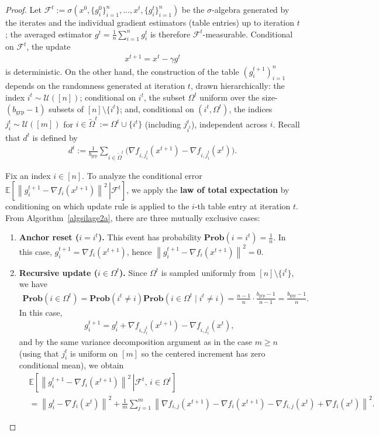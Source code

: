 \documentclass{article}
\newcommand{\sqn}[1]{\left\| #1 \right\|^2}
\newcommand{\eqdef}{:=}
\newcommand{\Prob}{\mathbf{Prob}}
\newcommand{\Expb}[2]{\mathbb{E}\!\left[\left. #1\,\right|#2 \right]}
\newcommand{\Expc}[1]{\Expb{#1}{\mathcal{F}^t}}
\newcommand{\rb}[1]{\left(#1\right)}
\theoremstyle{plain}
\begin{document}
\begin{proof}


Let $\mathcal{F}^t \eqdef \sigma\rb{x^0, \{g_i^0\}_{i=1}^n, \dots, x^t, \{g_i^t\}_{i=1}^n}$ be the $\sigma$-algebra generated by the iterates and the individual gradient estimators (table entries) up to iteration $t$; the averaged estimator $g^t = \frac{1}{n}\sum_{i=1}^n g_i^t$ is therefore $\mathcal{F}^t$-measurable. Conditional on $\mathcal{F}^t$, the update
\begin{align*}
x^{t+1}=x^t-\gamma g^t
\end{align*}
is deterministic. On the other hand, the construction of the table $(g_i^{t+1})_{i=1}^n$ depends on the randomness generated at iteration $t$, drawn hierarchically: the index $i^t\sim\mathcal{U}([n])$; conditional on $i^t$, the subset $\Omega^t$ uniform over the size-$(b_{\mathrm{grp}}-1)$ subsets of $[n]\setminus\{i^t\}$; and, conditional on $(i^t,\Omega^t)$, the indices $j_i^t\sim\mathcal{U}([m])$ for $i\in\tilde{\Omega}^t\eqdef \Omega^t\cup\{i^t\}$ (including $j_{i^t}^t$), independent across $i$. Recall that $d^t$ is defined by
\begin{align*}
d^t\eqdef \frac{1}{b_{\mathrm{grp}}}\sum_{i\in \tilde{\Omega}^t}\Big(\nabla f_{i,j_i^t}(x^{t+1})-\nabla f_{i,j_i^t}(x^{t})\Big).
\end{align*}

Fix an index $i\in[n]$. To analyze the conditional error $\Expc{\sqn{g_i^{t+1}-\nabla f_i(x^{t+1})}}$, we apply the \textbf{law of total expectation} by conditioning on which update rule is applied to the $i$-th table entry at iteration $t$. From Algorithm~\ref{algsilage2a}, there are three mutually exclusive cases:

\begin{enumerate}
\item \textbf{Anchor reset ($i=i^t$).} This event has probability $\Prob(i=i^t)=\frac{1}{n}$. In this case, $g_i^{t+1}=\nabla f_i(x^{t+1})$, hence $\sqn{g_i^{t+1}-\nabla f_i(x^{t+1})}=0$.

\item \textbf{Recursive update ($i\in\Omega^t$).} Since $\Omega^t$ is sampled uniformly from $[n]\setminus\{i^t\}$, we have
\begin{align*}
\Prob(i\in\Omega^t)=\Prob(i^t\neq i)\Prob(i\in\Omega^t\mid i^t\neq i)=\frac{n-1}{n}\cdot \frac{b_{\mathrm{grp}}-1}{n-1}=\frac{b_{\mathrm{grp}}-1}{n}.
\end{align*}
In this case,
\begin{align*}
g_i^{t+1}=g_i^t+\nabla f_{i,j_i^t}(x^{t+1})-\nabla f_{i,j_i^t}(x^{t}),
\end{align*}
and by the same variance decomposition argument as in the case $m\geq n$ (using that $j_i^t$ is uniform on $[m]$ so the centered increment has zero conditional mean), we obtain
\begin{align*}
&\Expb{\sqn{g_i^{t+1}-\nabla f_i(x^{t+1})}}{\mathcal{F}^t,\, i\in\Omega^t}\\
&=\sqn{g_i^t-\nabla f_i(x^{t})}+\frac{1}{m}\sum_{j=1}^m \sqn{\nabla f_{i,j}(x^{t+1})-\nabla f_i(x^{t+1})-\nabla f_{i,j}(x^{t})+\nabla f_i(x^{t})}.
\end{align*}


\end{enumerate}
\end{proof}
\end{document}

